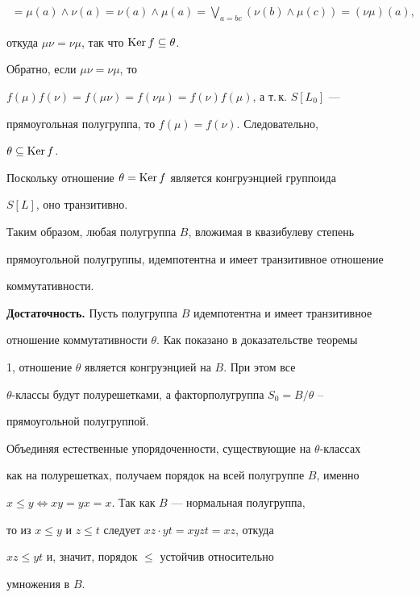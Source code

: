 \begin{pf}
\begin{multline*}
=\mu(a)\wedge\nu(a)=\nu(a)\wedge\mu(a)=


\bigvee_{a=bc}(\nu(b)\wedge\mu(c))=(\nu\mu)(a),


\end{multline*}


откуда $\mu\nu=\nu\mu$, так что $\operatorname{Ker} f\subseteq\theta$.


Обратно, если $\mu\nu=\nu\mu$, то


$f(\mu)f(\nu)=f(\mu\nu)=f(\nu\mu)=f(\nu)f(\mu)$, а т.\,к. $S[L_0]$ ---


прямоугольная полугруппа, то $f(\mu)=f(\nu)$.  Следовательно,


$\theta\subseteq \operatorname{Ker} f$.





Поскольку отношение $\theta=\operatorname{Ker} f$ является конгруэнцией группоида


$S[L]$, оно транзитивно.


Таким образом, любая полугруппа $B$, вложимая в квазибулеву степень


прямоугольной полугруппы, идемпотентна и имеет транзитивное отношение


коммутативности.


\smallskip





{\bf Достаточность.} Пусть полугруппа $B$ идемпотентна и имеет транзитивное


отношение коммутативности $\theta$. Как показано в доказательстве теоремы


1, отношение $\theta$ является конгруэнцией на $B$. При этом все


$\theta$-классы будут полурешетками, а факторполугруппа $S_0=B/\theta$ --


прямоугольной полугруппой.





Объединяя естественные упорядоченности, существующие на $\theta$-классах


как на полурешетках, получаем порядок на всей полугруппе $B$, именно


$x\leqslant y\Leftrightarrow xy=yx=x$. Так как $B$ --- нормальная полугруппа,


то из $x\leqslant y$ и $z\leqslant t$ следует $xz\cdot yt=xyzt=xz$, откуда


$xz\leqslant yt$ и, значит, порядок $\leqslant$ устойчив относительно


умножения в $B$.






\end{pf}
